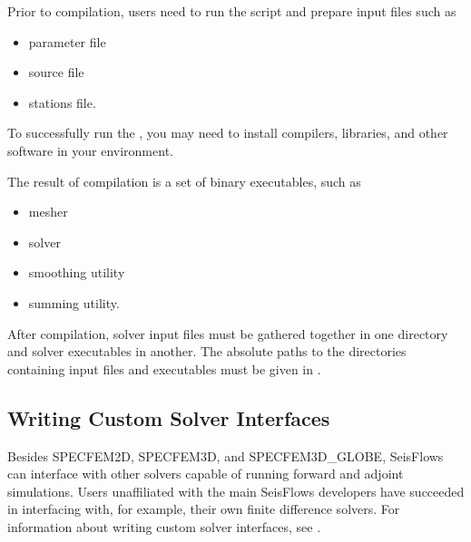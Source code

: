 \documentclass[letterpaper,10pt,english]{sphinxmanual}
\begin{document}
Prior to compilation, users need to run the  script and prepare input files such as
\begin{itemize}
\item {} 
parameter file

\item {} 
source file

\item {} 
stations file.

\end{itemize}

To successfully run the , you may need to install compilers, libraries, and other software in your environment.

The result of compilation is a set of binary executables, such as
\begin{itemize}
\item {} 
mesher

\item {} 
solver

\item {} 
smoothing utility

\item {} 
summing utility.

\end{itemize}

After compilation, solver input files must be gathered together in one directory and solver executables in another.  The absolute paths to the directories containing input files and executables must be given in .


\subsection{Writing Custom Solver Interfaces}
\label{\detokenize{main/usage:writing-custom-solver-interfaces}}
Besides SPECFEM2D, SPECFEM3D, and SPECFEM3D\_GLOBE, SeisFlows can interface with other solvers capable of running forward and adjoint simulations. Users unaffiliated with the main SeisFlows developers have succeeded in interfacing with, for example, their own finite difference solvers.  For information about writing custom solver interfaces, see {\hyperref[\detokenize{main/usage:developer}]{}}.
\end{document}
